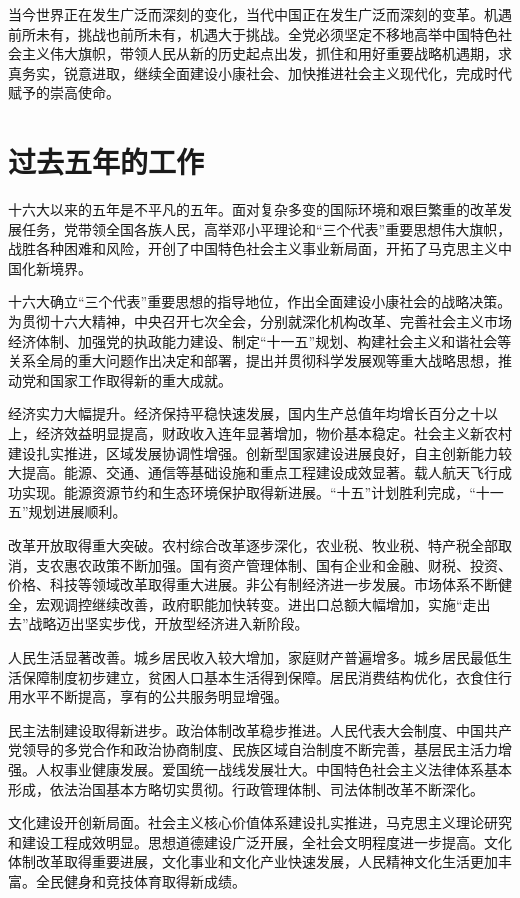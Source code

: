 当今世界正在发生广泛而深刻的变化，当代中国正在发生广泛而深刻的变革。机遇前所未有，挑战也前所未有，机遇大于挑战。全党必须坚定不移地高举中国特色社会主义伟大旗帜，带领人民从新的历史起点出发，抓住和用好重要战略机遇期，求真务实，锐意进取，继续全面建设小康社会、加快推进社会主义现代化，完成时代赋予的崇高使命。

\section{过去五年的工作}

十六大以来的五年是不平凡的五年。面对复杂多变的国际环境和艰巨繁重的改革发展任务，党带领全国各族人民，高举邓小平理论和“三个代表”重要思想伟大旗帜，战胜各种困难和风险，开创了中国特色社会主义事业新局面，开拓了马克思主义中国化新境界。

十六大确立“三个代表”重要思想的指导地位，作出全面建设小康社会的战略决策。为贯彻十六大精神，中央召开七次全会，分别就深化机构改革、完善社会主义市场经济体制、加强党的执政能力建设、制定“十一五”规划、构建社会主义和谐社会等关系全局的重大问题作出决定和部署，提出并贯彻科学发展观等重大战略思想，推动党和国家工作取得新的重大成就。

经济实力大幅提升。经济保持平稳快速发展，国内生产总值年均增长百分之十以上，经济效益明显提高，财政收入连年显著增加，物价基本稳定。社会主义新农村建设扎实推进，区域发展协调性增强。创新型国家建设进展良好，自主创新能力较大提高。能源、交通、通信等基础设施和重点工程建设成效显著。载人航天飞行成功实现。能源资源节约和生态环境保护取得新进展。“十五”计划胜利完成，“十一五”规划进展顺利。

改革开放取得重大突破。农村综合改革逐步深化，农业税、牧业税、特产税全部取消，支农惠农政策不断加强。国有资产管理体制、国有企业和金融、财税、投资、价格、科技等领域改革取得重大进展。非公有制经济进一步发展。市场体系不断健全，宏观调控继续改善，政府职能加快转变。进出口总额大幅增加，实施“走出去”战略迈出坚实步伐，开放型经济进入新阶段。

人民生活显著改善。城乡居民收入较大增加，家庭财产普遍增多。城乡居民最低生活保障制度初步建立，贫困人口基本生活得到保障。居民消费结构优化，衣食住行用水平不断提高，享有的公共服务明显增强。

民主法制建设取得新进步。政治体制改革稳步推进。人民代表大会制度、中国共产党领导的多党合作和政治协商制度、民族区域自治制度不断完善，基层民主活力增强。人权事业健康发展。爱国统一战线发展壮大。中国特色社会主义法律体系基本形成，依法治国基本方略切实贯彻。行政管理体制、司法体制改革不断深化。

文化建设开创新局面。社会主义核心价值体系建设扎实推进，马克思主义理论研究和建设工程成效明显。思想道德建设广泛开展，全社会文明程度进一步提高。文化体制改革取得重要进展，文化事业和文化产业快速发展，人民精神文化生活更加丰富。全民健身和竞技体育取得新成绩。

